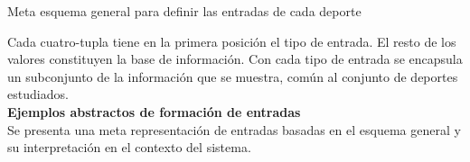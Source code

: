 \begin{table}[]
\begin{center}
    \end{center}
    \caption{Meta esquema general para definir las entradas de cada deporte}
    \label{tab:esquema_general}
\end{table}

    Cada cuatro-tupla tiene en la primera posición el tipo de entrada. El resto de los valores constituyen la base de información. Con cada tipo de entrada 
se encapsula un subconjunto de la información que se muestra, común al conjunto de deportes estudiados. 
    \\


    \textbf{Ejemplos abstractos de formación de entradas}\\

    Se presenta una meta representación de entradas basadas en el esquema general y su interpretación en el contexto del sistema.

